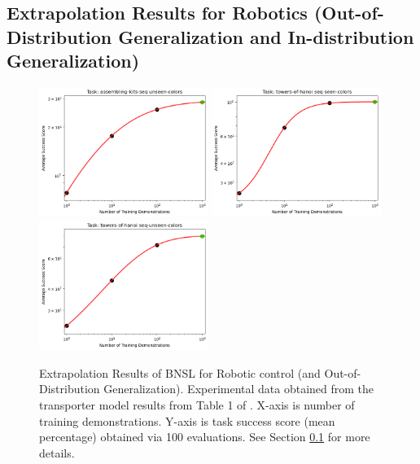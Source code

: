 \documentclass{article} %
\begin{document}
\subsection{Extrapolation Results for Robotics (Out-of-Distribution Generalization and In-distribution Generalization)}
\label{section:robot}
\vspace{-3.0mm}
\begin{figure}[htbp]
    \centering
\includegraphics[width=0.49\textwidth]{figures/robot/assembling-kits-seq_unseen-colors.png}
\includegraphics[width=0.49\textwidth]{figures/robot/towers-of-hanoi_seq-seen-colors.png}
\includegraphics[width=0.49\textwidth]{figures/robot/towers-of-hanoi_seq-unseen-colors.png}
\vspace{-3.0mm}
    \caption{
Extrapolation Results of BNSL for Robotic control (and Out-of-Distribution Generalization). Experimental data obtained from the transporter \citep{zeng2021transporter} model results from Table 1 of \cite{shridhar2021cliport}. X-axis is number of training demonstrations. Y-axis is task success score (mean percentage) obtained via 100 evaluations. See Section \ref{section:robot} for more details.
    }
    \label{fig:robot}
\end{figure}
\end{document}
